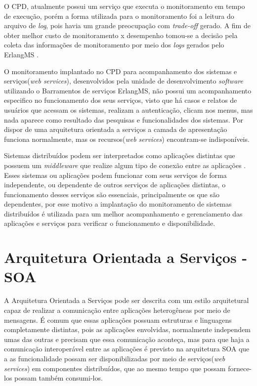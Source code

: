O CPD, atualmente possui um serviço que executa o monitoramento em tempo de execução, porém a forma utilizada para o monitoramento foi a leitura do arquivo de \textit{log}, pois havia um grande preocupação com \textit{trade-off} gerado. A fim de obter melhor custo de monitoramento x desempenho tomou-se a decisão pela coleta das informações de monitoramento por meio dos \textit{logs} gerados pelo ErlangMS \cite{filgueirasmonitoramento}.    

O monitoramento implantado no \acrshort{CPD} para acompanhamento dos sistemas e serviços(\textit{web services}), desenvolvidos pela unidade de desenvolvimento \textit{software} utilizando o Barramentos de serviços ErlangMS, não possui um acompanhamento especifico no funcionamento dos seus serviços, visto que há casos e relatos de usuários que acessam os sistemas, realizam a autenticação, clicam nos menus, mas nada aparece como resultado das pesquisas e funcionalidades dos sistemas. Por dispor de uma arquitetura orientada a serviços a camada de apresentação funciona normalmente, mas os recursos(\textit{web services}) encontram-se indisponíveis.

Sistemas distribuídos podem ser interpretados como aplicações distintas que possuem um \textit{middleware} que realize algum tipo de conexão entre as aplicações \cite{penteado2012jmonitor}. Esses sistemas ou aplicações podem funcionar com seus serviços de forma independente, ou dependente de outros serviços de aplicações distintas, o funcionamento desses serviços são essenciais, principalmente os que são dependentes, por esse motivo a implantação do monitoramento de sistemas distribuídos é utilizada para um melhor acompanhamento e gerenciamento das aplicações e serviços para verificar o funcionamento e disponibilidade.   


\section{Arquitetura Orientada a Serviços - SOA}

A Arquitetura Orientada a Serviços pode ser descrita com um estilo arquitetural capaz de realizar a comunicação entre aplicações heterogêneas por meio de mensagens\cite{fraser2007service}. É comum que essas aplicações possuam estruturas e linguagens completamente distintas, pois as aplicações envolvidas, normalmente independem umas das outras e precisam que essa comunicação aconteça, mas para que haja a comunicação interoperável entre as aplicações é previsto na arquitetura \acrshort{SOA} que a as funcionalidade possam ser disponibilizadas por meio de serviços(\textit{web services}) em componentes distribuídos, que ao mesmo tempo que possam fornece-los possam também consumi-los\cite{sward2011service,bianco2011architecting}.

